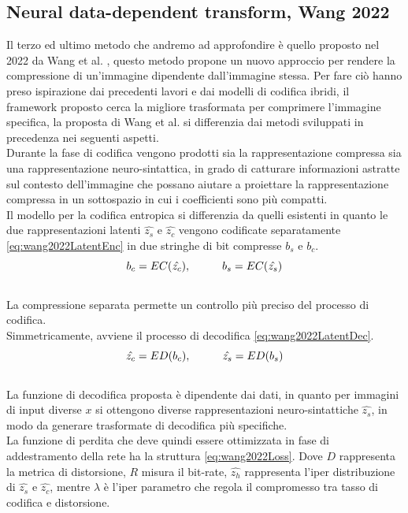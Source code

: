 \subsection{Neural data-dependent transform, Wang 2022}
Il terzo ed ultimo metodo che andremo ad approfondire è quello proposto nel 2022 da Wang et al. \cite{wang2022neural}, questo metodo propone un nuovo approccio per rendere la compressione di un’immagine dipendente dall’immagine stessa. Per fare ciò hanno preso ispirazione dai precedenti lavori e dai modelli di codifica ibridi, il framework proposto cerca la migliore trasformata per comprimere l’immagine specifica, la proposta di Wang et al. si differenzia dai metodi sviluppati in precedenza nei seguenti aspetti.\\
Durante la fase di codifica vengono prodotti sia la rappresentazione compressa sia una rappresentazione neuro-sintattica, in grado di catturare informazioni astratte sul contesto dell’immagine che possano aiutare a proiettare la rappresentazione compressa in un sottospazio in cui i coefficienti sono più compatti.\\
Il modello per la codifica entropica si differenzia da quelli esistenti in quanto le due rappresentazioni latenti $\hat{z_{s}}$ e $\hat{z_ {c}}$ vengono codificate separatamente \ref{eq:wang2022LatentEnc} in due stringhe di bit compresse $b_{s}$ e $b_{c}$.\\
\begin{equation}\label{eq:wang2022LatentEnc}
    b_{c} = EC (\hat{z_{c}}), \hspace{1 cm} b_{s} =  EC (\hat{z_{s}})
\end{equation}\\
La compressione separata permette un controllo più preciso del processo di codifica.\\
Simmetricamente, avviene il processo di decodifica \ref{eq:wang2022LatentDec}.\\
\begin{equation}\label{eq:wang2022LatentDec}
    \hat{z_{c}} =  ED (b_{c}), \hspace{1 cm} \hat{z_{s}} =  ED (b_{s}) 
\end{equation}\\
La funzione di decodifica proposta è dipendente dai dati, in quanto per immagini di input diverse $x$ si ottengono diverse rappresentazioni neuro-sintattiche $\hat{z_ {s}}$, in modo da generare trasformate di decodifica più specifiche.\\
La funzione di perdita che deve quindi essere ottimizzata in fase di addestramento della rete ha la struttura \ref{eq:wang2022Loss}. Dove $D$ rappresenta la metrica di distorsione, $R$ misura il bit-rate, $\hat{z_{h}}$ rappresenta l’iper distribuzione di $\hat{z_{s}}$ e $\hat{z_{c}}$, mentre $\lambda$ è l’iper parametro che regola il compromesso tra tasso di codifica e distorsione.\\

